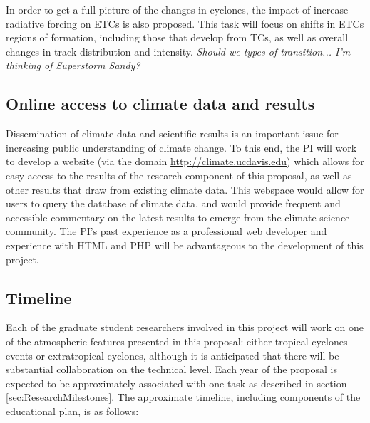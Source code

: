 \documentclass[11pt]{article}
\begin{document}
In order to get a full picture of the changes in cyclones, the impact of increase radiative forcing on ETCs is also proposed. This task will focus on shifts in ETCs regions of formation, including those that develop from TCs, as well as overall changes in track distribution and intensity. \emph{Should we types of transition... I'm thinking of Superstorm Sandy?}

\subsection{Online access to climate data and results}

Dissemination of climate data and scientific results is an important issue for increasing public understanding of climate change.  To this end, the PI will work to develop a website (via the domain \url{http://climate.ucdavis.edu}) which allows for easy access to the results of the research component of this proposal, as well as other results that draw from existing climate data.  This webspace would allow for users to query the database of climate data, and would provide frequent and accessible commentary on the latest results to emerge from the climate science community.  The PI's past experience as a professional web developer and experience with HTML and PHP will be advantageous to the development of this project.

\subsection{Timeline} \label{sec:Timeline}

Each of the graduate student researchers involved in this project will work on one of the atmospheric features presented in this proposal: either tropical cyclones events or extratropical cyclones, although it is anticipated that there will be substantial collaboration on the technical level.  Each year of the proposal is expected to be approximately associated with one task as described in section \ref{sec:ResearchMilestones}.  The approximate timeline, including components of the educational plan, is as follows:
\end{document}
